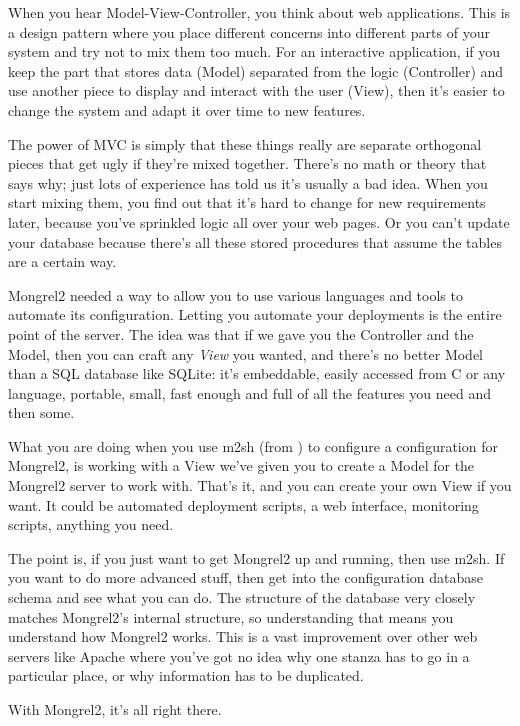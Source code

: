When you hear Model-View-Controller, you think about web applications.  This is a design pattern
where you place different concerns into different parts of your system and try not to mix them
too much.  For an interactive application, if you keep the part that stores data (Model) separated
from the logic (Controller) and use another piece to display and interact with the user (View), then
it's easier to change the system and adapt it over time to new features.

The power of MVC is simply that these things really are separate orthogonal pieces that get
ugly if they're mixed together.  There's no math or theory that says why; just lots of
experience has told us it's usually a bad idea.  When you start mixing them, you find out that
it's hard to change for new requirements later, because you've sprinkled logic all over your
web pages.  Or you can't update your database because there's all these stored procedures that
assume the tables are a certain way.

Mongrel2 needed a way to allow you to use various languages and tools to automate its configuration.
Letting you automate your deployments is the entire point of the server.  The idea was that if we
gave you the Controller and the Model, then you can craft any \emph{View} you wanted, and there's
no better Model than a SQL database like SQLite:  it's embeddable, easily accessed from C or any
language, portable, small, fast enough and full of all the features you need and then some.

What you are doing when you use m2sh (from ) to configure a
configuration for Mongrel2, is working with a View we've given you to create a
Model for the Mongrel2 server to work with.  That's it, and you can create your
own View if you want.  It could be automated deployment scripts, a web
interface, monitoring scripts, anything you need.

The point is, if you just want to get Mongrel2 up and running, then use m2sh.  If you want to
do more advanced stuff, then get into the configuration database schema and see what you can
do.  The structure of the database very closely matches Mongrel2's internal structure, so
understanding that means you understand how Mongrel2 works.  This is a vast improvement over
other web servers like Apache where you've got no idea why one stanza has to go in a particular
place, or why information has to be duplicated.

With Mongrel2, it's all right there.


